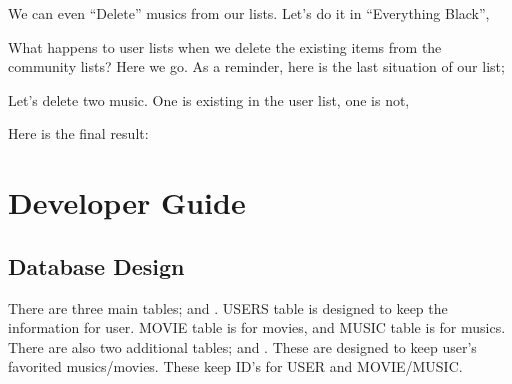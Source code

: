 \documentclass[letterpaper,10pt,english]{sphinxmanual}
\begin{document}
We can even “Delete” musics from our lists. Let’s do it in “Everything Black”,
\begin{quote}

\begin{figure}[htbp]
\centering

\noindent{}
\end{figure}
\end{quote}

What happens to user lists when we delete the existing items from the community lists?
Here we go. As a reminder, here is the last situation of our list;
\begin{quote}

\begin{figure}[htbp]
\centering

\noindent{}
\end{figure}
\end{quote}

Let’s delete two music. One is existing in the user list, one is not,
\begin{quote}

\begin{figure}[htbp]
\centering

\noindent{}
\end{figure}
\end{quote}

Here is the final result:
\begin{quote}

\begin{figure}[htbp]
\centering

\noindent{}
\end{figure}
\end{quote}


\chapter{Developer Guide}
\label{\detokenize{developer/index:developer-guide}}\label{\detokenize{developer/index::doc}}

\section{Database Design}
\label{\detokenize{developer/index:database-design}}
There are three main tables;  and .
USERS table is designed to keep the information for user. MOVIE table is for movies, and MUSIC table is for musics.
There are also two additional tables;  and . These are designed to keep user’s favorited musics/movies.
These keep ID’s for USER and MOVIE/MUSIC.
\end{document}
